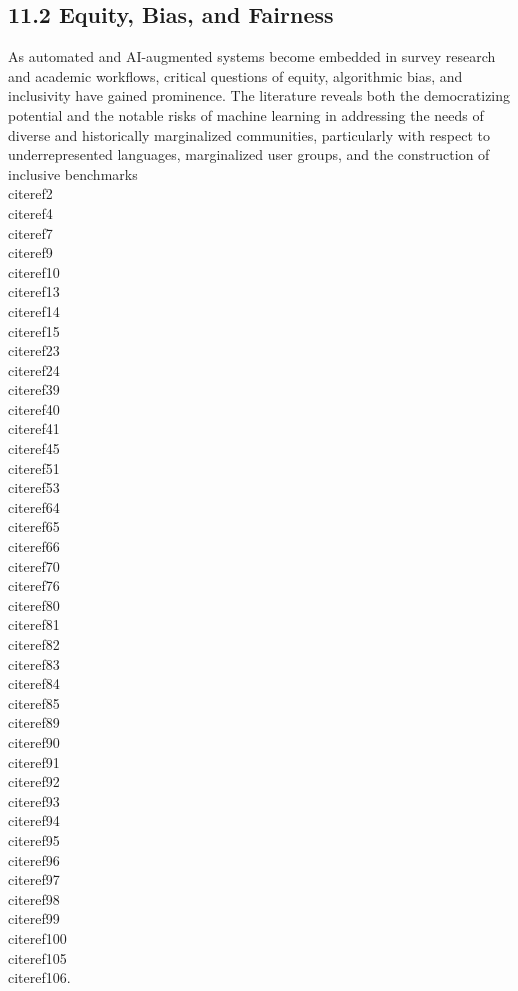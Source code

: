 \documentclass[11pt]{article}
\begin{document}
\subsection{11.2 Equity, Bias, and Fairness}

As automated and AI-augmented systems become embedded in survey research and academic workflows, critical questions of equity, algorithmic bias, and inclusivity have gained prominence. The literature reveals both the democratizing potential and the notable risks of machine learning in addressing the needs of diverse and historically marginalized communities, particularly with respect to underrepresented languages, marginalized user groups, and the construction of inclusive benchmarks \\cite{ref2}\\cite{ref4}\\cite{ref7}\\cite{ref9}\\cite{ref10}\\cite{ref13}\\cite{ref14}\\cite{ref15}\\cite{ref23}\\cite{ref24}\\cite{ref39}\\cite{ref40}\\cite{ref41}\\cite{ref45}\\cite{ref51}\\cite{ref53}\\cite{ref64}\\cite{ref65}\\cite{ref66}\\cite{ref70}\\cite{ref76}\\cite{ref80}\\cite{ref81}\\cite{ref82}\\cite{ref83}\\cite{ref84}\\cite{ref85}\\cite{ref89}\\cite{ref90}\\cite{ref91}\\cite{ref92}\\cite{ref93}\\cite{ref94}\\cite{ref95}\\cite{ref96}\\cite{ref97}\\cite{ref98}\\cite{ref99}\\cite{ref100}\\cite{ref105}\\cite{ref106}.
\end{document}
